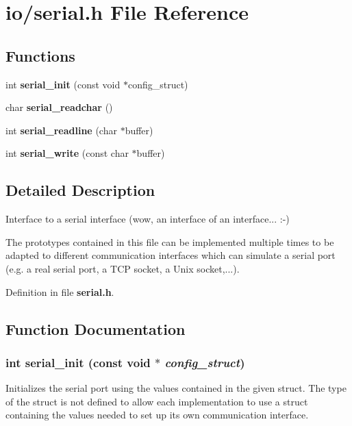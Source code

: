 \section{io/serial.h File Reference}
\label{db/d11/serial_8h}
\subsection*{Functions}
\begin{DoxyCompactItemize}
\item 
int {\bf serial\_\-init} (const void $\ast$config\_\-struct)
\item 
char {\bf serial\_\-readchar} ()
\item 
int {\bf serial\_\-readline} (char $\ast$buffer)
\item 
int {\bf serial\_\-write} (const char $\ast$buffer)
\end{DoxyCompactItemize}


\subsection{Detailed Description}
Interface to a serial interface (wow, an interface of an interface... :-\/)

The prototypes contained in this file can be implemented multiple times to be adapted to different communication interfaces which can simulate a serial port (e.g. a real serial port, a TCP socket, a Unix socket,...). 

Definition in file {\bf serial.h}.



\subsection{Function Documentation}
\subsubsection[{serial\_\-init}]{\setlength{\rightskip}{0pt plus 5cm}int serial\_\-init (const void $\ast$ {\em config\_\-struct})}\label{db/d11/serial_8h_a780f33805db9929dfe0215720973c20b}
Initializes the serial port using the values contained in the given struct. The type of the struct is not defined to allow each implementation to use a struct containing the values needed to set up its own communication interface.

